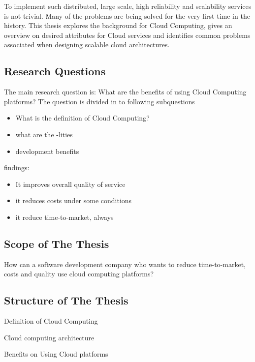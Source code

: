 \documentclass{tktltiki}
\begin{document}
To implement such distributed, large scale, high reliability and scalability services is not trivial.  Many of the problems are being solved for the very first time in the history.  This thesis explores the background for Cloud Computing, gives an overview on desired attributes for Cloud services and identifies common problems associated when designing scalable cloud architectures.
        

\subsection{Research Questions}

The main research question is: What are the benefits of using Cloud Computing platforms?  The question is divided in to following subquestions

\begin{itemize}
\item{What is the definition of Cloud Computing?}
\item{what are the -lities}
\item{development benefits}
\end{itemize}


findings:

\begin{itemize}
\item{It improves overall quality of service}
\item{it reduces costs under some conditions}
\item{it reduce time-to-market, always}
\end{itemize}





\subsection{Scope of The Thesis}

How can a software development company who wants to reduce time-to-market, costs and quality use cloud computing platforms?


\subsection{Structure of The Thesis}

Definition of Cloud Computing

Cloud computing architecture

Benefits on Using Cloud platforms
\end{document}
